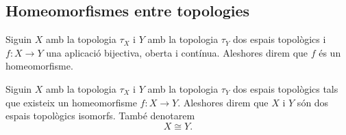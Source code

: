 \documentclass[../Apunts.tex]{subfiles}
\begin{document}
	\subsection{Homeomorfismes entre topologies}
	\begin{definition}[Homeomorfisme]
		\label{def:homeomorfisme entre topologies}
		Siguin \(X\) amb la topologia \(\tau_{X}\) i \(Y\) amb la topologia \(\tau_{Y}\) dos espais topològics i \(f\colon X\longrightarrow Y\) una aplicació bijectiva, oberta i contínua. Aleshores direm que \(f\) és un homeomorfisme.
	\end{definition}
	\begin{definition}
		\label{def:espais topològics isomorfs}
		Siguin \(X\) amb la topologia \(\tau_{X}\) i \(Y\) amb la topologia \(\tau_{Y}\) dos espais topològics tals que existeix un homeomorfisme \(f\colon X\longrightarrow Y\). Aleshores direm que \(X\) i \(Y\) són dos espais topològics isomorfs. També denotarem
		\[X\cong Y.\]
	\end{definition}
\end{document}
